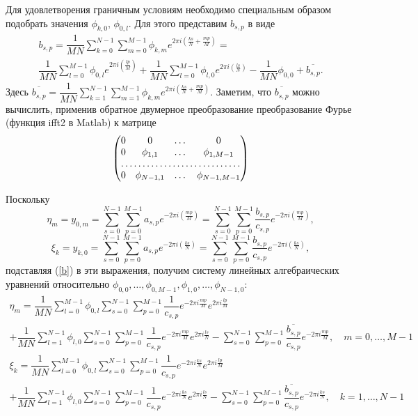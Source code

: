 \documentclass[11pt]{article}
\begin{document}
Для удовлетворения граничным условиям необходимо специальным образом подобрать значения $\phi_{k,0}, \, \phi_{0,l}$. Для этого представим
$b_{s,p}$ в виде 
\begin{multline} 
b_{s,p}=\dfrac{1}{MN}\sum_{k=0}^{N-1}\sum_{m=0}^{M-1}\phi_{k,m}e^{2\pi i \left(\frac{ks}{N} + \frac{mp}{M}\right)}= \\
\dfrac{1}{MN}\sum_{l=0}^{M-1}\phi_{0,l}e^{2\pi i \left(\frac{lp}{M}\right)} + 
\dfrac{1}{MN}\sum_{l=0}^{M-1}\phi_{l,0}e^{2\pi i \left(\frac{ls}{N}\right)} - \dfrac{1}{MN}\phi_{0,0} + \overline{b_{s,p}}.\label{b}
\end{multline}
Здесь $\overline{b_{s,p}} = \dfrac{1}{MN}\sum\limits_{k=1}^{N-1}\sum\limits_{m=1}^{M-1}\phi_{k,m}e^{2\pi i \left(\frac{ks}{N} + \frac{mp}{M}\right)}$.
Заметим, что $\overline{b_{s,p}}$ можно вычислить, применив обратное двумерное преобразование преобразование Фурье (функция ifft2 в Matlab) к матрице 
\[ 
\begin{pmatrix}
	0 & 0 & \dots & 0 \\
	0 & \phi_{1,1} & \dots & \phi_{1,M-1} \\
	\hdotsfor{4} \\
	0 & \phi_{N-1,1} & \dots & \phi_{N-1, M-1}
\end{pmatrix}
\]

\newpage
Поскольку
$$ \eta_m = y_{0,m} = \sum_{s=0}^{N-1}\sum_{p=0}^{M-1}a_{s,p}e^{-2\pi i \left(\frac{mp}{M}\right)} = 
\sum_{s=0}^{N-1}\sum_{p=0}^{M-1}\dfrac{b_{s,p}}{c_{s,p}}e^{-2\pi i \left(\frac{mp}{M}\right)},$$
$$ \xi_k = y_{k,0} = \sum_{s=0}^{N-1}\sum_{p=0}^{M-1}a_{s,p}e^{-2\pi i \left(\frac{ks}{N}\right)} = 
\sum_{s=0}^{N-1}\sum_{p=0}^{M-1}\dfrac{b_{s,p}}{c_{s,p}}e^{-2\pi i \left(\frac{ks}{N}\right)},$$
подставляя (\ref{b}) в эти выражения, получим систему линейных алгебраических уравнений относительно
$\phi_{0,0}, \ldots, \phi_{0,M-1}, \phi_{1,0}, \ldots, \phi_{N-1,0}$:
\begin{multline}
\eta_m = \dfrac{1}{MN}\sum_{l=0}^{M-1}\phi_{0,l}\sum_{s=0}^{N-1}\sum_{p=0}^{M-1}\dfrac{1}{c_{s,p}}e^{-2\pi i\frac{mp}{M}}e^{2\pi i\frac{lp}{M}} \\
+ \dfrac{1}{MN}\sum_{l=1}^{N-1}\phi_{l,0}\sum_{s=0}^{N-1}\sum_{p=0}^{M-1}\dfrac{1}{c_{s,p}}e^{-2\pi i\frac{mp}{M}}e^{2\pi i\frac{ls}{N}}
- \sum_{s=0}^{N-1}\sum_{p=0}^{M-1}\dfrac{\overline{b_{s,p}}}{c_{s,p}}e^{-2\pi i\frac{mp}{M}}, \quad m = 0,\ldots,M-1
\end{multline}
\begin{multline}
\xi_k = \dfrac{1}{MN}\sum_{l=0}^{M-1}\phi_{0,l}\sum_{s=0}^{N-1}\sum_{p=0}^{M-1}\dfrac{1}{c_{s,p}}e^{-2\pi i\frac{ks}{N}}e^{2\pi i\frac{lp}{M}} \\
+ \dfrac{1}{MN}\sum_{l=1}^{N-1}\phi_{l,0}\sum_{s=0}^{N-1}\sum_{p=0}^{M-1}\dfrac{1}{c_{s,p}}e^{-2\pi i\frac{ks}{N}}e^{2\pi i\frac{ls}{N}}
- \sum_{s=0}^{N-1}\sum_{p=0}^{M-1}\dfrac{\overline{b_{s,p}}}{c_{s,p}}e^{-2\pi i\frac{ks}{N}}, \quad k = 1,\ldots,N-1
\end{multline}
\end{document}
